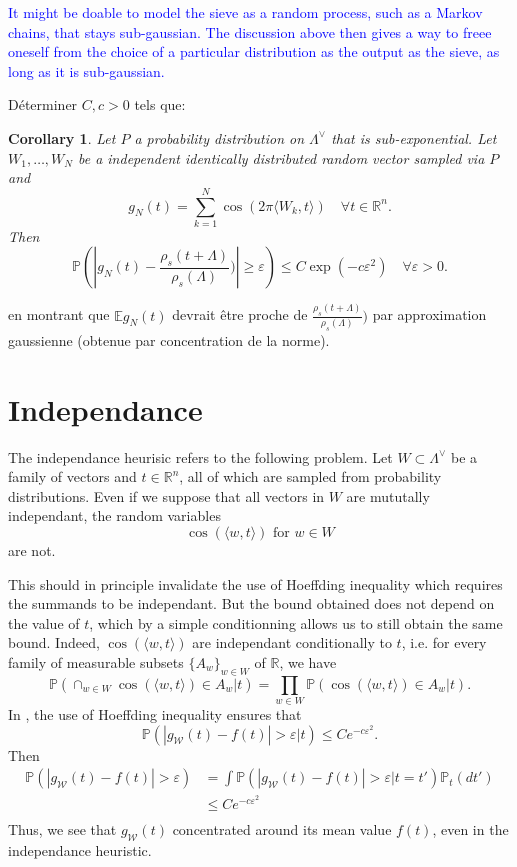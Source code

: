 \documentclass{article}
\newtheorem{corollary}{Corollary}[theorem]
\begin{document}
\textcolor{blue}{It might be doable to model the sieve as a random process, such as a Markov chains, that stays sub-gaussian. The discussion above then gives a way to freee oneself from the choice of a particular distribution as the output as the sieve, as long as it is sub-gaussian.}

Déterminer $C,c> 0$ tels que:
\begin{corollary}
Let $P$ a probability distribution on $\Lambda^\vee$ that is sub-exponential. Let $W_1,\ldots , W_N$ be a independent identically distributed random vector sampled via $P$ and 
\[g_N(t) = \sum_{k=1}^N\cos(2\pi \langle W_k,t\rangle )\quad\forall t\in\mathbb R^n.\] 
Then 
\[\mathbb P( |g_N(t) - \frac{\rho_s(t+\Lambda)}{\rho_s(\Lambda)}) |\geq \varepsilon ) \leq  C \exp( - c\varepsilon^2) \quad \forall \varepsilon >0.\]
\end{corollary}
en montrant que $\mathbb Eg_N(t) $ devrait être proche de $\frac{\rho_s(t+\Lambda)}{\rho_s(\Lambda)})$ par approximation gaussienne (obtenue par concentration de la norme).

\section{Independance}  %

The independance heurisic refers to the following problem. Let $W\subset  \Lambda^\vee$ be a family of vectors and $t\in \mathbb R^n$, all of which are sampled from probability distributions. Even if we suppose that all vectors in $W$ are mututally independant, the random variables 
\[\cos (\langle w ,t \rangle) \text{ for }w\in W\]
are not. 

This should in principle invalidate the use of Hoeffding inequality which requires the summands to be independant. But the bound obtained does not depend on the value of $t$, which by a simple conditionning allows us to still obtain the same bound. Indeed, $\cos (\langle w ,t \rangle)$ are independant conditionally to $t$, i.e. for every family of measurable subsets $\{A_w\}_{w\in W}$ of $\mathbb R$, we have
\[ \mathbb P(\cap_{w\in W} \cos (\langle w ,t \rangle) \in A_w | t) =\prod_{w\in W} \mathbb P(\cos (\langle w ,t \rangle) \in A_w | t) .\] 
In \cite{PoulyShen}, the use of Hoeffding inequality ensures that
\[\mathbb P(|g_{\mathcal{W}}(t)-f(t)| > \varepsilon |t) \leq Ce^{-c\varepsilon^2}.\]
Then 
\[\begin{split}
\mathbb P(|g_{\mathcal{W}}(t)-f(t)| > \varepsilon ) & =\int \mathbb P(|g_{\mathcal{W}}(t)-f(t)| > \varepsilon |t = t')\mathbb P_t(dt') \\
		& \leq Ce^{-c\varepsilon^2}\\
\end{split}\]
Thus, we see that $g_{\mathcal{W}}(t)$ concentrated around its mean value $f(t)$, even in the independance heuristic.
\end{document}
